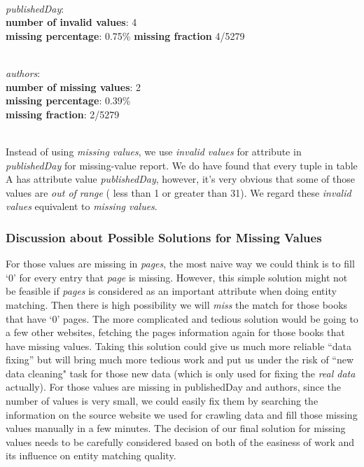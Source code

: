 \documentclass[10pt, oneside]{article}
\begin{document}
\vspace{1ex}
\noindent
\\
\textit{publishedDay}: \\
\textbf{number of invalid values}: 4 \\ 
\textbf{missing percentage}: 0.75\% 
\textbf{missing fraction} 4/5279

\vspace{1ex}
\noindent
\\
\textit{authors}: \\
\textbf{number of missing values}: 2 \\ 
\textbf{missing percentage}: 0.39\% \\
\textbf{missing fraction}: 2/5279

\vspace{1ex}
\noindent
\\
Instead of using \textit{missing values}, we use \textit{invalid values} for attribute in \textit{publishedDay} for missing-value report. We do have found that every tuple in table A has attribute value 
\textit{publishedDay}, however, it's very obvious that some of those values are \textit{out of range} ( less than 1 or greater than 31). We regard these \textit{invalid values}
equivalent to \textit{missing values}.    

\subsubsection*{Discussion about Possible Solutions for Missing Values}
For those values are missing in \textit{pages}, the most naive way we could think is to fill `0' for every entry that \textit{page} is missing. However, this simple solution might not 
be feasible if \textit{pages} is considered as an important attribute when doing entity matching. Then there is high possibility we will \textit{miss} the match for those books that 
have `0' pages. The more complicated and tedious solution would be going to a few other websites, fetching the pages information again for those books that have missing values. Taking this
solution could give us much more reliable ``data fixing'' but will bring much more tedious work and put us under the risk of ``new data cleaning" task for those new data (which
is only used for fixing the \textit{real data} actually). For those values are missing in publishedDay and authors, since the number of values is very small, we could easily fix them
by searching the information on the source website we used for crawling data and fill those missing values manually in a few minutes. The decision of our final solution for missing 
values needs to be carefully considered based on both of the easiness of work and its influence on entity matching quality. 
\end{document}
